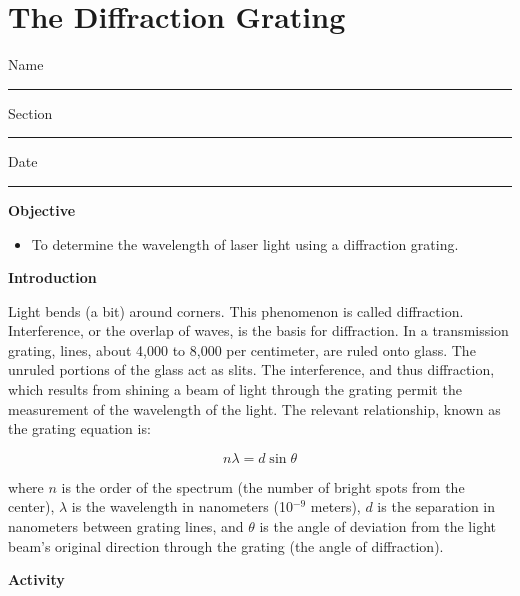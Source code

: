 
\section{The Diffraction Grating}

Name \rule{2.0in}{0.1pt}\hfill{}Section \rule{1.0in}{0.1pt}\hfill{}Date
\rule{1.0in}{0.1pt}

\textbf{Objective}

\begin{itemize}
\item To determine the wavelength of laser light using a diffraction grating.
\end{itemize}
\textbf{Introduction}

Light bends (a bit) around corners. This phenomenon is called diffraction.
Interference, or the overlap of waves, is the basis for diffraction.
In a transmission grating, lines, about 4,000 to 8,000 per centimeter,
are ruled onto glass. The unruled portions of the glass act as slits.
The interference, and thus diffraction, which results from shining
a beam of light through the grating permit the measurement of the
wavelength of the light. The relevant relationship, known as the grating
equation is:

\begin{displaymath} n\lambda = d \sin \theta \end{displaymath}

where $n$ is the order of the spectrum (the number of bright spots
from the center), $\lambda$ is the wavelength in nanometers (10\( ^{-9} \)
meters), $d$ is the separation in nanometers between grating lines,
and $\theta$ is the angle of deviation from the light beam's original
direction through the grating (the angle of diffraction).

\textbf{Activity}


